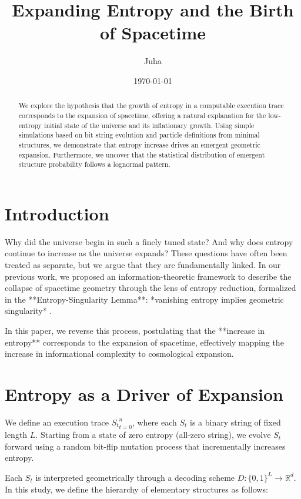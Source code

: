 \documentclass[11pt]{article}
\title{Expanding Entropy and the Birth of Spacetime}
\author{Juha}
\date{\today}
\begin{document}
\maketitle
\fi


\begin{abstract}
   We explore the hypothesis that the growth of entropy in a computable execution trace corresponds to the expansion of spacetime,
   offering a natural explanation for the low-entropy initial state of the universe and its inflationary growth. Using simple simulations
   based on bit string evolution and particle definitions from minimal structures, we demonstrate that entropy
   increase drives an emergent geometric expansion. Furthermore, we uncover that the statistical distribution of emergent
   structure probability follows a lognormal pattern.
\end{abstract}

\section{Introduction}

Why did the universe begin in such a finely tuned state? And why does entropy continue to increase as the universe expands?
These questions have often been treated as separate, but we argue that they are fundamentally linked.
In our previous work, we proposed an information-theoretic framework to describe the collapse of spacetime geometry through
the lens of entropy reduction, formalized in the **Entropy-Singularity Lemma**: *vanishing entropy implies geometric
singularity* \cite{Paper1}.

In this paper, we reverse this process, postulating that the **increase in entropy** corresponds to the expansion of spacetime,
effectively mapping the increase in informational complexity to cosmological expansion.


\section{Entropy as a Driver of Expansion}

We define an execution trace ${S_t}_{t=0}^n$, where each $S_t$ is a binary string of fixed length $L$.
Starting from a state of zero entropy (all-zero string), we evolve $S_t$ forward using a random bit-flip mutation process that
incrementally increases entropy.

Each $S_t$ is interpreted geometrically through a decoding scheme $D: \{0,1\}^L \to \mathbb{R}^d$. In this study,
we define the hierarchy of elementary structures as follows:
\end{document}
